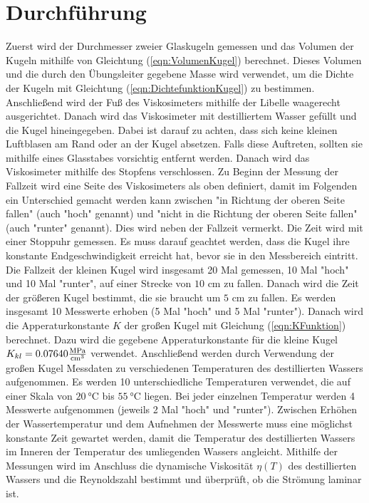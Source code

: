 \section{Durchführung}
\label{sec:Durchführung}
Zuerst wird der Durchmesser zweier Glaskugeln gemessen und das Volumen der Kugeln mithilfe von Gleichtung
(\ref{eqn:VolumenKugel}) berechnet. Dieses Volumen und die durch den Übungsleiter gegebene Masse 
wird verwendet, um die Dichte der Kugeln mit Gleichtung 
(\ref{eqn:DichtefunktionKugel}) zu bestimmen.  
Anschließend wird der Fuß des Viskosimeters mithilfe der Libelle waagerecht ausgerichtet. 
Danach wird das Viskosimeter mit destilliertem Wasser gefüllt und die Kugel hineingegeben. 
Dabei ist darauf zu achten, dass sich keine kleinen Luftblasen am Rand oder an der Kugel absetzen. 
Falls diese Auftreten, sollten sie mithilfe eines Glasstabes vorsichtig entfernt werden. Danach wird 
das Viskosimeter mithilfe des Stopfens verschlossen. Zu Beginn der Messung der Fallzeit wird eine Seite 
des Viskosimeters als oben definiert, damit im Folgenden ein Unterschied gemacht werden kann zwischen 
"in Richtung der oberen Seite fallen" (auch "hoch" genannt) und "nicht in die Richtung der oberen Seite fallen"
(auch "runter" genannt). Dies wird neben der Fallzeit vermerkt. Die Zeit wird mit einer Stoppuhr gemessen. 
Es muss darauf geachtet werden, dass
die Kugel ihre konstante Endgeschwindigkeit erreicht hat, bevor sie in den Messbereich eintritt. 
Die Fallzeit der kleinen Kugel wird insgesamt 20 Mal gemessen, 10 Mal "hoch" und 10 Mal "runter", auf einer Strecke von 
$10$ \unit{\centi\meter} zu fallen. Danach wird die Zeit der größeren Kugel bestimmt, 
die sie braucht um $5$ \unit{\centi\meter} zu fallen.
Es werden insgesamt 10 Messwerte erhoben (5 Mal "hoch"\,\,und 5 Mal "runter").
Danach wird die Apperaturkonstante $K$ der großen Kugel mit Gleichung (\ref{eqn:KFunktion}) berechnet. Dazu wird die gegebene 
Apperaturkonstante für die kleine Kugel $K_{kl} = 0.07640 \unit[per-mode=fraction]{\mega\pascal\per\cubic\centi\meter}$ 
verwendet. 
Anschließend werden durch Verwendung der großen Kugel Messdaten zu verschiedenen Temperaturen des 
destillierten Wassers aufgenommen. 
Es werden 10 unterschiedliche Temperaturen verwendet, die auf einer Skala von $\SI{20}{\celsius}$ bis 
$\SI{55}{\celsius}$ liegen. Bei jeder einzelnen Temperatur werden 4 Messwerte aufgenommen (jeweils 2 Mal 
"hoch" und "runter").
Zwischen Erhöhen der Wassertemperatur und dem Aufnehmen der Messwerte muss eine möglichst konstante Zeit 
gewartet werden, damit die Temperatur des destillierten Wassers im Inneren der Temperatur des umliegenden 
Wassers angleicht. 
Mithilfe der Messungen wird im Anschluss die dynamische Viskosität $\eta(T)$ des destillierten Wassers und die 
Reynoldszahl bestimmt und überprüft, ob die Strömung laminar ist.

